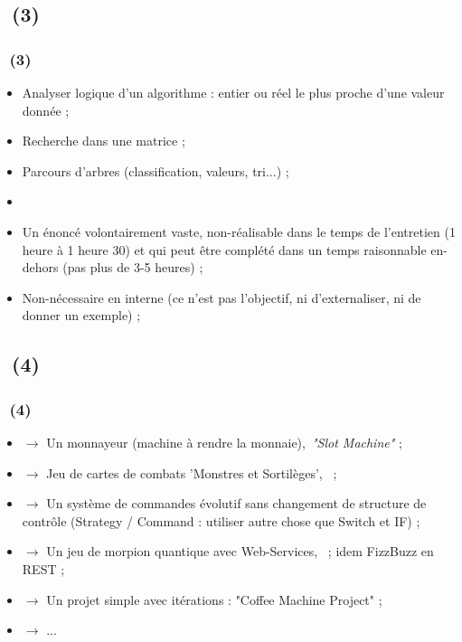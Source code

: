 \documentclass{beamer}
\begin{document}
\subsection{\titleExemplesCyberFizzBuzz ~(3)}
\begin{frame}
	\frametitle{\titleExemplesCyberFizzBuzz ~(3)}
	\begin{itemize}
		\item Analyser logique d'un algorithme : entier ou r{\'e}el le plus proche d'une valeur donn{\'e}e ; 
		\item Recherche dans une matrice ; 
		\item Parcours d'arbres (classification, valeurs, tri...) ; 
		\item[] 
		\item Un {\'e}nonc{\'e} volontairement vaste, non-r{\'e}alisable dans le temps de l'entretien (1 heure {\`a} 1 heure 30) et qui peut {\^e}tre compl{\'e}t{\'e} dans un temps raisonnable en-dehors (pas plus de 3-5 heures) ; 
		\item Non-n{\'e}cessaire en interne (ce n'est pas l'objectif, ni d'externaliser, ni de donner un exemple) ; 
	\end{itemize}
\end{frame} 

\subsection{\titleExemplesCyberFizzBuzz ~(4)}
\begin{frame}
	\frametitle{\titleExemplesCyberFizzBuzz ~(4)}
	\begin{itemize}
		\item $\rightarrow$ Un monnayeur (machine {\`a} rendre la monnaie),~\newline \emph{"Slot Machine"} ;
		\item $\rightarrow$ Jeu de cartes de combats 'Monstres et Sortil{\`e}ges',~ ;
		\item $\rightarrow$ Un syst{\`e}me de commandes {\'e}volutif sans changement de structure de contr{\^o}le (Strategy / Command : utiliser autre chose que Switch et IF) ;
		\item $\rightarrow$ Un jeu de morpion quantique avec Web-Services,~ ; idem FizzBuzz en REST ;
		\item $\rightarrow$ Un projet simple avec it{\'e}rations : "Coffee Machine Project" ; 
		\item $\rightarrow$ ...
	\end{itemize}
\end{frame} 
\end{document}
